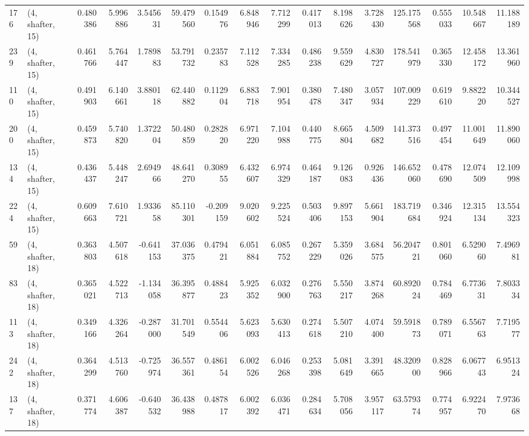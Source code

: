 \begin{tabular}{llrrrrrrrrrrrrrr}
176 &  (4, shafter, 15) &   0.480386 &   5.996886 &  3.545631 &   59.479560 &  0.154976 &   6.848946 &   7.712299 &  0.417013 &   8.198626 &   3.728430 &  125.175568 &  0.555033 &  10.548667 &  11.188189 \\
239 &  (4, shafter, 15) &   0.461766 &   5.764447 &  1.789883 &   53.791732 &  0.235783 &   7.112528 &   7.334285 &  0.486238 &   9.559629 &   4.830727 &  178.541979 &  0.365330 &  12.458172 &  13.361960 \\
110 &  (4, shafter, 15) &   0.491903 &   6.140661 &  3.880118 &   62.440882 &  0.112904 &   6.883718 &   7.901954 &  0.380478 &   7.480347 &   3.057934 &  107.009229 &  0.619610 &   9.882220 &  10.344527 \\
200 &  (4, shafter, 15) &   0.459873 &   5.740820 &  1.372204 &   50.480859 &  0.282820 &   6.971220 &   7.104988 &  0.440775 &   8.665804 &   4.509682 &  141.373516 &  0.497454 &  11.001649 &  11.890060 \\
134 &  (4, shafter, 15) &   0.436437 &   5.448247 &  2.694966 &   48.641270 &  0.308955 &   6.432607 &   6.974329 &  0.464187 &   9.126083 &   0.926436 &  146.652060 &  0.478690 &  12.074509 &  12.109998 \\
224 &  (4, shafter, 15) &   0.609663 &   7.610721 &  1.933658 &   85.110301 & -0.209159 &   9.020602 &   9.225524 &  0.503406 &   9.897153 &   5.661904 &  183.719684 &  0.346924 &  12.315134 &  13.554323 \\
59  &  (4, shafter, 18) &   0.363803 &   4.507618 & -0.641153 &   37.036375 &  0.479421 &   6.051884 &   6.085752 &  0.267229 &   5.359026 &   3.684575 &   56.204721 &  0.801060 &   6.529060 &   7.496981 \\
83  &  (4, shafter, 18) &   0.365021 &   4.522713 & -1.134058 &   36.395877 &  0.488423 &   5.925352 &   6.032900 &  0.276763 &   5.550217 &   3.874268 &   60.892024 &  0.784469 &   6.773631 &   7.803334 \\
113 &  (4, shafter, 18) &   0.349166 &   4.326264 & -0.287000 &   31.701549 &  0.554406 &   5.623093 &   5.630413 &  0.274618 &   5.507210 &   4.074400 &   59.591873 &  0.789071 &   6.556763 &   7.719577 \\
242 &  (4, shafter, 18) &   0.364299 &   4.513760 & -0.725974 &   36.557361 &  0.486154 &   6.002526 &   6.046268 &  0.253398 &   5.081649 &   3.391665 &   48.320900 &  0.828966 &   6.067743 &   6.951324 \\
137 &  (4, shafter, 18) &   0.371774 &   4.606387 & -0.640532 &   36.438988 &  0.487817 &   6.002392 &   6.036471 &  0.284634 &   5.708056 &   3.957117 &   63.579374 &  0.774957 &   6.922470 &   7.973668 \\

\end{tabular}
